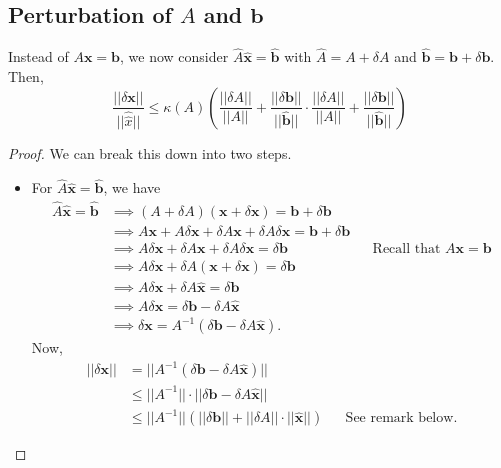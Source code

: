 \documentclass[letterpaper]{article}
\newcommand{\0}{\mathbf{0}}
\renewcommand{\b}{\mathbf{b}}
\newcommand{\x}{\mathbf{x}}
\begin{document}
\subsection{Perturbation of \texorpdfstring{$A$}{A} and \texorpdfstring{$\b$}{b}}
\begin{theorem}{}{}
    Instead of $A\x = \b$, we now consider $\hat{A}\hat{\x} = \hat{\b}$ with $\hat{A} = A + \delta A$ and $\hat{\b} = \b + \delta\b$. Then, 
    \[\frac{||\delta \x||}{||\hat{\hat{x}}||} \leq \kappa(A) \left(\frac{||\delta A||}{||A||} + \frac{||\delta \b||}{||\hat{\b}||} \cdot \frac{||\delta A||}{||A||} + \frac{||\delta \b||}{||\hat{\b}||}\right)\]
\end{theorem}

\begin{proof}
    We can break this down into two steps.
    \begin{itemize}
        \item For $\hat{A}\hat{\x} = \hat{\b}$, we have 
        \begin{equation*}
            \begin{aligned}
                \hat{A}\hat{\x} = \hat{\b} &\implies (A + \delta A)(\x + \delta \x) = \b + \delta \b \\ 
                    &\implies A\x + A\delta\x + \delta A \x + \delta A \delta \x = \b + \delta \b \\ 
                    &\implies A\delta\x + \delta A \x + \delta A \delta \x = \delta \b && \text{Recall that } A\x = \b \\ 
                    &\implies A\delta\x + \delta A(\x + \delta \x) = \delta \b \\ 
                    &\implies A\delta\x + \delta A\hat{\x} = \delta\b \\ 
                    &\implies A\delta\x = \delta\b - \delta A \hat{\x} \\ 
                    &\implies \delta\x = A^{-1}(\delta \b - \delta A \hat{\x}).
            \end{aligned}
        \end{equation*}
        Now, 
        \begin{equation*}
            \begin{aligned}
                ||\delta\x|| &= ||A^{-1}(\delta \b - \delta A \hat{\x})|| \\
                    &\leq ||A^{-1}|| \cdot ||\delta \b - \delta A \hat{\x}|| \\ 
                    &\leq ||A^{-1}|| (||\delta\b|| + ||\delta A|| \cdot ||\hat{\x}||) && \text{See remark below}.

\end{aligned}
\end{equation*}
\end{itemize}
\end{proof}
\end{document}
